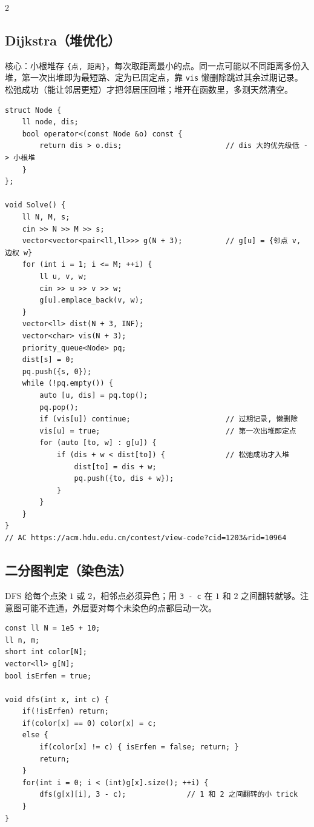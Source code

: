 \begin{multicols*}{2}
		\subsection{Dijkstra（堆优化）}

		核心：小根堆存 \texttt{\{点, 距离\}}，每次取距离最小的点。同一点可能以不同距离多份入堆，第一次出堆即为最短路、定为已固定点，靠 \texttt{vis} 懒删除跳过其余过期记录。松弛成功（能让邻居更短）才把邻居压回堆；堆开在函数里，多测天然清空。

		\begin{verbatim}
struct Node {
    ll node, dis;
    bool operator<(const Node &o) const {
        return dis > o.dis;                        // dis 大的优先级低 -> 小根堆
    }
};

void Solve() {
    ll N, M, s;
    cin >> N >> M >> s;
    vector<vector<pair<ll,ll>>> g(N + 3);          // g[u] = {邻点 v, 边权 w}
    for (int i = 1; i <= M; ++i) {
        ll u, v, w;
        cin >> u >> v >> w;
        g[u].emplace_back(v, w);
    }
    vector<ll> dist(N + 3, INF);
    vector<char> vis(N + 3);
    priority_queue<Node> pq;
    dist[s] = 0;
    pq.push({s, 0});
    while (!pq.empty()) {
        auto [u, dis] = pq.top();
        pq.pop();
        if (vis[u]) continue;                      // 过期记录, 懒删除
        vis[u] = true;                             // 第一次出堆即定点
        for (auto [to, w] : g[u]) {
            if (dis + w < dist[to]) {              // 松弛成功才入堆
                dist[to] = dis + w;
                pq.push({to, dis + w});
            }
        }
    }
}
// AC https://acm.hdu.edu.cn/contest/view-code?cid=1203&rid=10964
		\end{verbatim}


		\subsection{二分图判定（染色法）}

		DFS 给每个点染 $1$ 或 $2$，相邻点必须异色；用 \texttt{3 - c} 在 $1$ 和 $2$ 之间翻转就够。注意图可能不连通，外层要对每个未染色的点都启动一次。

		\begin{verbatim}
const ll N = 1e5 + 10;
ll n, m;
short int color[N];
vector<ll> g[N];
bool isErfen = true;

void dfs(int x, int c) {
    if(!isErfen) return;
    if(color[x] == 0) color[x] = c;
    else {
        if(color[x] != c) { isErfen = false; return; }
        return;
    }
    for(int i = 0; i < (int)g[x].size(); ++i) {
        dfs(g[x][i], 3 - c);              // 1 和 2 之间翻转的小 trick
    }
}


\end{verbatim}
\end{multicols*}
